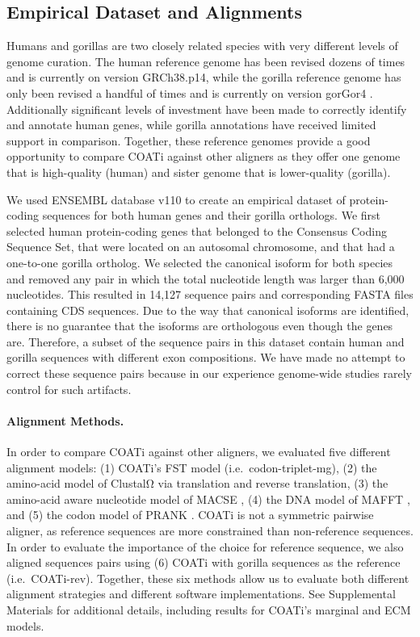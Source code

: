\documentclass[12pt,letterpaper]{article}
\begin{document}
\subsection*{Empirical Dataset and Alignments}

Humans and gorillas are two closely related species with very different levels of genome curation. The human reference genome has been revised dozens of times and is currently on version GRCh38.p14, while the gorilla reference genome has only been revised a handful of times and is currently on version gorGor4 \citep[cf.\ ENSEMBL database v110;][]{ensembl_hubbard_2002}. Additionally significant levels of investment have been made to correctly identify and annotate human genes, while gorilla annotations have received limited support in comparison. Together, these reference genomes provide a good opportunity to compare COATi against other aligners as they offer one genome that is high-quality (human) and sister genome that is lower-quality (gorilla).

We used ENSEMBL database v110 \citep{ensembl_hubbard_2002} to create an empirical dataset of protein-coding sequences for both human genes and their gorilla orthologs. We first selected human protein-coding genes that belonged to the Consensus Coding Sequence Set, that were located on an autosomal chromosome, and that had a one-to-one gorilla ortholog. We selected the canonical isoform for both species and removed any pair in which the total nucleotide length was larger than 6,000 nucleotides. This resulted in 14,127 sequence pairs and corresponding FASTA files containing CDS sequences. Due to the way that canonical isoforms are identified, there is no guarantee that the isoforms are orthologous even though the genes are. Therefore, a subset of the sequence pairs in this dataset contain human and gorilla sequences with different exon compositions. We have made no attempt to correct these sequence pairs because in our experience genome-wide studies rarely control for such artifacts.

\paragraph{Alignment Methods.}

In order to compare COATi against other aligners, we evaluated five different alignment models: (1) COATi's FST model (i.e.\ codon-triplet-mg), (2) the amino-acid model of ClustalΩ \citep{clustal_omega_sievers_2011} via translation and reverse translation, (3) the amino-acid aware nucleotide model of MACSE \citep{ranwez_macse_2018}, (4) the DNA model of MAFFT \citep{katoh2013mafft}, and (5) the codon model of PRANK \citep{prank_loytynoja_2014}. 
COATi is not a symmetric pairwise aligner, as reference sequences are more constrained than non-reference sequences. In order to evaluate the importance of the choice for reference sequence, we also aligned sequences pairs using (6) COATi with gorilla sequences as the reference (i.e.\ COATi-rev). Together, these six methods allow us to evaluate both different alignment strategies and different software implementations. See Supplemental Materials for additional details, including results for COATi's marginal and ECM models.
\end{document}
